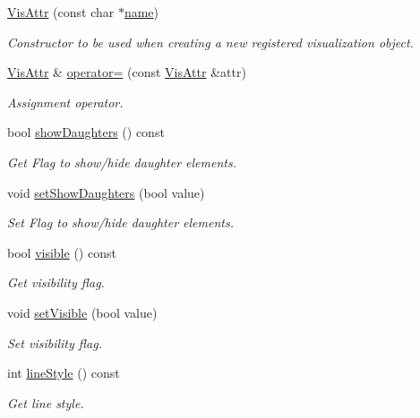 \begin{DoxyCompactItemize}
\hyperlink{class_d_d4hep_1_1_geometry_1_1_vis_attr_aba0f08cd43ea7d03cf730c5549356fa6}{Vis\+Attr} (const char $\ast$\hyperlink{class_d_d4hep_1_1_handle_a27c7d467a609ab32c133e1f3c7d85ef5}{name})
\begin{DoxyCompactList}\small\item\em Constructor to be used when creating a new registered visualization object. \end{DoxyCompactList}\item 
\hyperlink{class_d_d4hep_1_1_geometry_1_1_vis_attr}{Vis\+Attr} \& \hyperlink{class_d_d4hep_1_1_geometry_1_1_vis_attr_a02a672b6dc4e30bb7208960a7a54f2ac}{operator=} (const \hyperlink{class_d_d4hep_1_1_geometry_1_1_vis_attr}{Vis\+Attr} \&attr)
\begin{DoxyCompactList}\small\item\em Assignment operator. \end{DoxyCompactList}\item 
bool \hyperlink{class_d_d4hep_1_1_geometry_1_1_vis_attr_a4fca55563416a5f9304fb0a8a1001b5c}{show\+Daughters} () const
\begin{DoxyCompactList}\small\item\em Get Flag to show/hide daughter elements. \end{DoxyCompactList}\item 
void \hyperlink{class_d_d4hep_1_1_geometry_1_1_vis_attr_af29f0854b9e6866b31830dd673f92df8}{set\+Show\+Daughters} (bool value)
\begin{DoxyCompactList}\small\item\em Set Flag to show/hide daughter elements. \end{DoxyCompactList}\item 
bool \hyperlink{class_d_d4hep_1_1_geometry_1_1_vis_attr_a0e7156c94d67d4a6ca80222154d3d03c}{visible} () const
\begin{DoxyCompactList}\small\item\em Get visibility flag. \end{DoxyCompactList}\item 
void \hyperlink{class_d_d4hep_1_1_geometry_1_1_vis_attr_a499e3e8252f4abd62be3a3be521f10b4}{set\+Visible} (bool value)
\begin{DoxyCompactList}\small\item\em Set visibility flag. \end{DoxyCompactList}\item 
int \hyperlink{class_d_d4hep_1_1_geometry_1_1_vis_attr_a7dd0a16cc0fe20a9c947e8455b9144e2}{line\+Style} () const
\begin{DoxyCompactList}\small\item\em Get line style. \end{DoxyCompactList}\item 

\end{DoxyCompactItemize}
